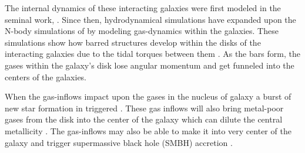 \documentclass[iop,revtex4,twocolumn,apj,numberedappendix,appendixfloats]{emulateapj}
\begin{document}
The internal dynamics of these interacting galaxies were first modeled in the seminal work, \citet{Toomre:1972}. Since then, hydrodynamical simulations have expanded upon the N-body simulations of \citet{Toomre:1972} by modeling gas-dynamics within the galaxies. These simulations show how barred structures develop within the disks of the interacting galaxies due to the tidal torques between them \citep{Barnes:1991}. As the bars form, the gases within the galaxy's disk lose angular momentum and get funneled into the centers of the galaxies. 

When the gas-inflows impact upon the gases in the nucleus of galaxy a burst of new star formation in triggered \citep{Barnes:1996, Mihos:1996}. These gas inflows will also bring metal-poor gases from the disk into the center of the galaxy which can dilute the central metallicity \citep{Rupke:2010, Perez:2011, Scudder:2012}. The gas-inflows may also be able to make it into very center of the galaxy and trigger supermassive black hole (SMBH) accretion \citep{Capelo:2017}. \\



\end{document}
